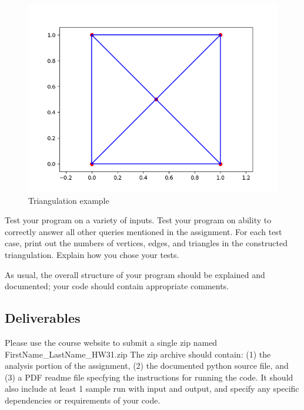 \documentclass[11pt]{article}
\begin{document}
\begin{description}
\begin{figure}[H]
  \centering
  \includegraphics[scale=0.45]{triangle.png}
  \caption{Triangulation example}
  \label{fig:triangle}
\end{figure}


Test your program on a variety of inputs. %
Test your program on ability to correctly answer all
other queries mentioned in the assignment. For each test case, print
out the numbers of vertices, edges, and triangles in the constructed
triangulation.   Explain how you chose your tests. 


As usual, the overall structure of your program should be explained and documented; your code should contain appropriate comments.
\end{description}
 
 

\subsection*{Deliverables}

Please use the course website to submit a single  zip  named   FirstName\_LastName\_HW31.zip
The zip archive should contain:  (1) the analysis portion of the assignment,  (2)  the documented python source file, and (3) a PDF readme file  specfying the instructions for running the code.  It should also include at least 1 sample run with input and output,  and specify any specific dependencies or requirements of your code.   
\end{document}
